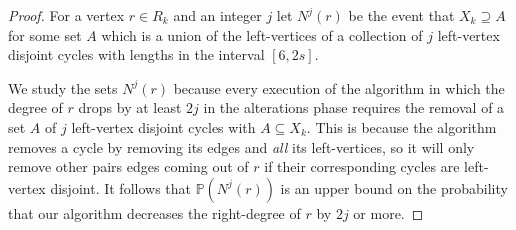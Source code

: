 \documentclass[12pt]{amsart}
\theoremstyle{definition}
\newcommand{\PP}{\ensuremath{\mathbb{P}}}
\newcommand{\1}{\ensuremath{\mathbb{1}}}
\begin{document}
\begin{proof} For a vertex $r\in R_k$ and an integer $j$ let $N^j(r)$ be the event that $X_k\supseteq A$ for some set $A$ which is a union of the left-vertices of a collection of $j$ left-vertex disjoint cycles with lengths in the interval $[6,2s]$. 

We study the sets $N^j(r)$ because every execution of the algorithm in which the degree of $r$ drops by at least $2j$ in the alterations phase requires the removal of a set $A$ of $j$ left-vertex disjoint cycles with $A\subseteq X_k$. This is because the algorithm removes a cycle by removing its edges and \emph{all} its left-vertices, so it will only remove other pairs edges coming out of $r$ if their corresponding cycles are left-vertex disjoint. It follows that $\PP(N^j(r))$ is an upper bound on the probability that our algorithm decreases the right-degree of $r$ by $2j$ or more. 


\end{proof}
\end{document}
